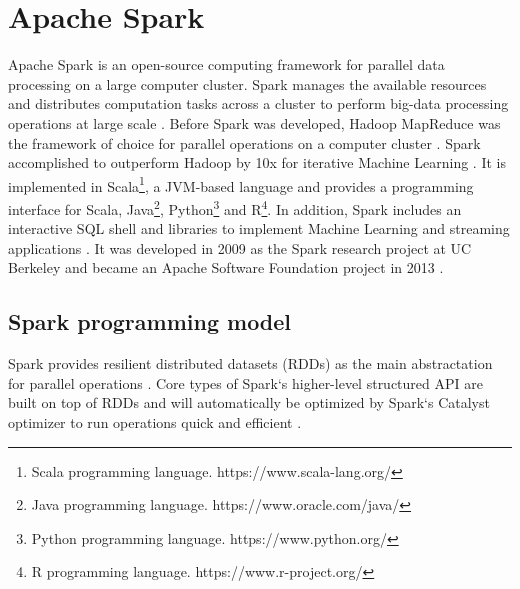 \section{Apache Spark}
Apache Spark is an open-source computing framework for parallel data processing on a large computer cluster. Spark manages the available resources and distributes computation tasks across a cluster to perform big-data processing operations at large scale \cite{Chambers2018Spark}. Before Spark was developed, Hadoop MapReduce \cite{Dean2010MapReduce} was the framework of choice for parallel operations on a computer cluster \cite{Zaharia2010Spark}. Spark accomplished to outperform Hadoop by 10x for iterative Machine Learning \cite{Zaharia2010Spark}. It is implemented in Scala\footnote{Scala programming language. https://www.scala-lang.org/}, a JVM-based language and provides a programming interface for Scala, Java\footnote{Java programming language. https://www.oracle.com/java/}, Python\footnote{Python programming language. https://www.python.org/} and R\footnote{R programming language. https://www.r-project.org/}. In addition, Spark includes an interactive SQL shell and libraries to implement Machine Learning and streaming applications \cite{Chambers2018Spark}.
It was developed in 2009 as the Spark research project at UC Berkeley and became an Apache Software Foundation project in 2013 \cite{Chambers2018Spark}. 


\subsection{Spark programming model}

Spark provides resilient distributed datasets (RDDs) as the main abstractation for parallel operations \cite{Zaharia2010Spark}. Core types of Spark`s higher-level structured API are built on top of RDDs \cite{Chambers2018Spark} and will automatically be optimized by Spark`s Catalyst optimizer to run operations quick and efficient \cite{Hien2018Spark}.


